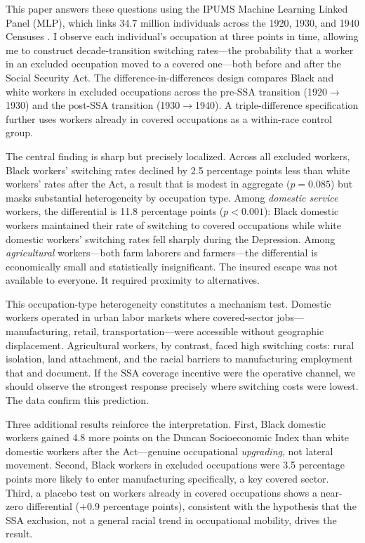 \documentclass[12pt]{article}
\begin{document}
This paper answers these questions using the IPUMS Machine Learning Linked Panel (MLP), which links 34.7 million individuals across the 1920, 1930, and 1940 Censuses \citep{ruggles2024, price2020}. I observe each individual's occupation at three points in time, allowing me to construct decade-transition switching rates---the probability that a worker in an excluded occupation moved to a covered one---both before and after the Social Security Act. The difference-in-differences design compares Black and white workers in excluded occupations across the pre-SSA transition (1920$\to$1930) and the post-SSA transition (1930$\to$1940). A triple-difference specification further uses workers already in covered occupations as a within-race control group.

The central finding is sharp but precisely localized. Across all excluded workers, Black workers' switching rates declined by 2.5 percentage points less than white workers' rates after the Act, a result that is modest in aggregate ($p = 0.085$) but masks substantial heterogeneity by occupation type. Among \textit{domestic service} workers, the differential is 11.8 percentage points ($p < 0.001$): Black domestic workers maintained their rate of switching to covered occupations while white domestic workers' switching rates fell sharply during the Depression. Among \textit{agricultural} workers---both farm laborers and farmers---the differential is economically small and statistically insignificant. The insured escape was not available to everyone. It required proximity to alternatives.

This occupation-type heterogeneity constitutes a mechanism test. Domestic workers operated in urban labor markets where covered-sector jobs---manufacturing, retail, transportation---were accessible without geographic displacement. Agricultural workers, by contrast, faced high switching costs: rural isolation, land attachment, and the racial barriers to manufacturing employment that \citet{whatley1990} and \citet{sundstrom1994} document. If the SSA coverage incentive were the operative channel, we should observe the strongest response precisely where switching costs were lowest. The data confirm this prediction.

Three additional results reinforce the interpretation. First, Black domestic workers gained 4.8 more points on the Duncan Socioeconomic Index \citep{duncan1961} than white domestic workers after the Act---genuine occupational \textit{upgrading}, not lateral movement. Second, Black workers in excluded occupations were 3.5 percentage points more likely to enter manufacturing specifically, a key covered sector. Third, a placebo test on workers already in covered occupations shows a near-zero differential ($+0.9$ percentage points), consistent with the hypothesis that the SSA exclusion, not a general racial trend in occupational mobility, drives the result.
\end{document}
